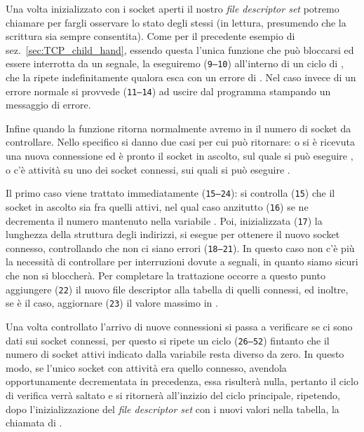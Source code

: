 Una volta inizializzato con i socket aperti il nostro \textit{file descriptor
  set} potremo chiamare  per fargli osservare lo stato degli
stessi (in lettura, presumendo che la scrittura sia sempre consentita). Come
per il precedente esempio di sez.~\ref{sec:TCP_child_hand}, essendo questa
l'unica funzione che può bloccarsi ed essere interrotta da un segnale, la
eseguiremo (\texttt{\small 9--10}) all'interno di un ciclo di ,
che la ripete indefinitamente qualora esca con un errore di .
Nel caso invece di un errore normale si provvede (\texttt{\small 11--14}) ad
uscire dal programma stampando un messaggio di errore.

Infine quando la funzione ritorna normalmente avremo in  il numero di
socket da controllare. Nello specifico si danno due casi per cui 
può ritornare: o si è ricevuta una nuova connessione ed è pronto il socket in
ascolto, sul quale si può eseguire , o c'è attività su uno dei
socket connessi, sui quali si può eseguire .

Il primo caso viene trattato immediatamente (\texttt{\small 15--24}): si
controlla (\texttt{\small 15}) che il socket in ascolto sia fra quelli attivi,
nel qual caso anzitutto (\texttt{\small 16}) se ne decrementa il numero
mantenuto nella variabile . Poi, inizializzata (\texttt{\small 17}) la
lunghezza della struttura degli indirizzi, si esegue  per
ottenere il nuovo socket connesso, controllando che non ci siano errori
(\texttt{\small 18--21}). In questo caso non c'è più la necessità di
controllare per interruzioni dovute a segnali, in quanto siamo sicuri che
 non si bloccherà. Per completare la trattazione occorre a questo
punto aggiungere (\texttt{\small 22}) il nuovo file descriptor alla tabella di
quelli connessi, ed inoltre, se è il caso, aggiornare (\texttt{\small 23}) il
valore massimo in .

Una volta controllato l'arrivo di nuove connessioni si passa a verificare se
ci sono dati sui socket connessi, per questo si ripete un ciclo
(\texttt{\small 26--52}) fintanto che il numero di socket attivi indicato
dalla variabile  resta diverso da zero. In questo modo, se l'unico
socket con attività era quello connesso, avendola opportunamente decrementata
in precedenza, essa risulterà nulla, pertanto il ciclo di verifica verrà
saltato e si ritornerà all'inzizio del ciclo principale, ripetendo, dopo
l'inizializzazione del \textit{file descriptor set} con i nuovi valori nella
tabella, la chiamata di .

